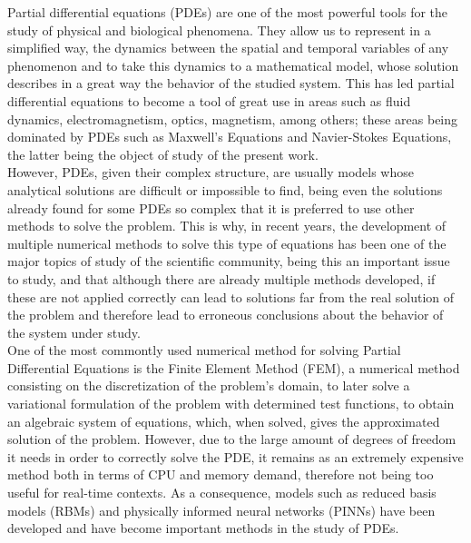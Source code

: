 \documentclass[12pt,letterpaper]{article}
\begin{document}
Partial differential equations (PDEs) are one of the most powerful tools for the study of physical 
and biological phenomena. They allow us to represent in a simplified way, the dynamics 
between the spatial and temporal variables of any phenomenon and to take this dynamics to a 
mathematical model, whose solution describes in a great way the behavior of the studied 
system\cite{logan2014applied}. This has led partial differential equations to become 
a tool of great use in areas such as fluid dynamics, electromagnetism, optics, magnetism, 
among others\cite{farlow1993partial}; these areas being dominated by PDEs such as Maxwell's 
Equations and Navier-Stokes Equations, the latter being the object of study of the present 
work. \\

However, PDEs, given their complex structure, are usually models whose analytical solutions 
are difficult or impossible to find, being even the solutions already found for some PDEs 
so complex that it is preferred to use other methods to solve the problem\cite{strauss2007partial}. This is why, in 
recent years, the development of multiple numerical methods to solve this type of equations 
has been one of the major topics of study of the scientific community, being this an 
important issue to study, and that although there are already multiple methods developed, 
if these are not applied correctly can lead to solutions far from the real solution of the 
problem and therefore lead to erroneous conclusions about the behavior of the system under 
study.\\

One of the most commontly used numerical method for solving Partial Differential Equations
is the Finite Element Method (FEM), a numerical method consisting on the discretization of
the problem's domain, to later solve a variational formulation of the problem with 
determined test functions, to obtain an algebraic system of equations, which, when solved, 
gives the approximated solution of the problem. However, due to the large amount of degrees 
of freedom it needs in order to correctly solve the PDE, it remains as an extremely 
expensive method both in terms of CPU and memory demand, therefore not being too useful for 
real-time contexts\cite{hesthaven2018non}\cite{PINNQuarteroni}. As a consequence, models 
such as reduced basis models (RBMs) and physically informed neural networks (PINNs) have 
been developed and have become important methods in the study of PDEs.\\
\end{document}
